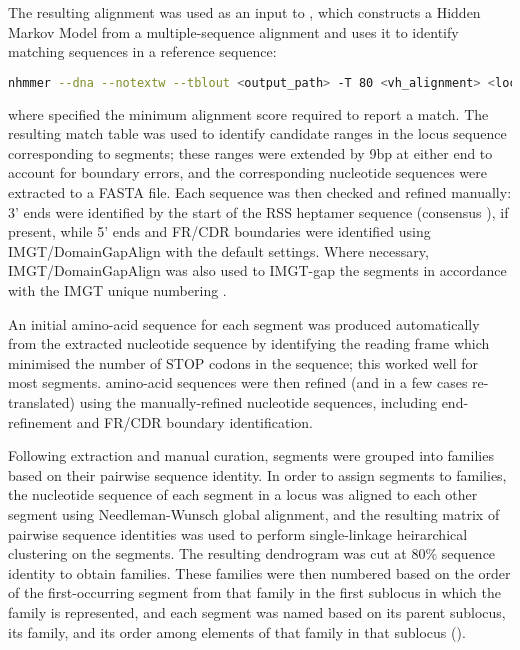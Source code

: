 \noindent The resulting alignment was used as an input to  \parencite{wheeler2013nhmmer,eddy2011hmm,eddy2009homology,eddy2008alignment}, which constructs a Hidden Markov Model from a multiple-sequence alignment and uses it to identify matching sequences in a reference sequence:

\begin{lstlisting}[language=bash]
nhmmer --dna --notextw --tblout <output_path> -T 80 <vh_alignment> <locus_sequence_path>
\end{lstlisting}

\noindent where  specified the minimum alignment score required to report a match. The resulting match table was used to identify candidate ranges in the locus sequence corresponding to \vh segments; these ranges were extended by 9bp at either end to account for boundary errors, and the corresponding nucleotide sequences were extracted to a FASTA file. Each sequence was then checked and refined manually: 3' ends were identified by the start of the RSS heptamer sequence (consensus  ), if present, while 5' ends and FR/CDR boundaries were identified using IMGT/DomainGapAlign \parencite{ehrenmann2011domaingapalign} with the default settings. Where necessary, IMGT/DomainGapAlign was also used to IMGT-gap the \vh segments in accordance with the IMGT unique numbering \parencite{lefranc2003vnumbering}.

An initial amino-acid sequence for each \vh segment was produced automatically from the extracted nucleotide sequence by identifying the reading frame which minimised the number of STOP codons in the sequence; this worked well for most segments. \vh amino-acid sequences were then refined (and in a few cases re-translated) using the manually-refined nucleotide sequences, including end-refinement and FR/CDR boundary identification.

Following extraction and manual curation, \vh segments were grouped into families based on their pairwise sequence identity. In order to assign segments to families, the nucleotide sequence of each \vh segment in a locus was aligned to each other segment using Needleman-Wunsch global alignment, and the resulting matrix of pairwise sequence identities was used to perform single-linkage heirarchical clustering on the \vh segments. The resulting dendrogram was cut at 80\% sequence identity to obtain \vh families. These families were then numbered based on the order of the first-occurring \vh segment from that family in the first \igh{} sublocus in which the family is represented, and each \vh segment was named based on its parent sublocus, its family, and its order among elements of that family in that sublocus ().

